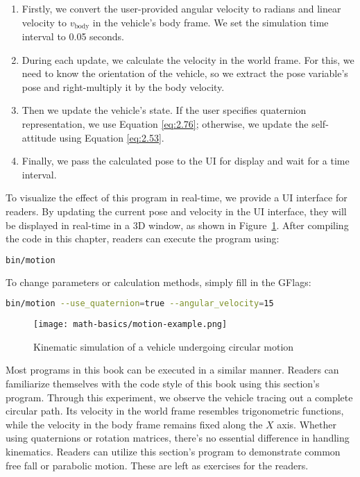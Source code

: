 \begin{enumerate}
	\item Firstly, we convert the user-provided angular velocity to radians and linear velocity to \( v_{\text{body}} \) in the vehicle's body frame. We set the simulation time interval to 0.05 seconds.
	\item During each update, we calculate the velocity in the world frame. For this, we need to know the orientation of the vehicle, so we extract the pose variable's pose and right-multiply it by the body velocity.
	\item Then we update the vehicle's state. If the user specifies quaternion representation, we use Equation \eqref{eq:2.76}; otherwise, we update the self-attitude using Equation \eqref{eq:2.53}.
	\item Finally, we pass the calculated pose to the UI for display and wait for a time interval.
\end{enumerate}

To visualize the effect of this program in real-time, we provide a UI interface for readers. By updating the current pose and velocity in the UI interface, they will be displayed in real-time in a 3D window, as shown in Figure~\ref{fig:motion-example}. After compiling the code in this chapter, readers can execute the program using:

\begin{lstlisting}[language=sh,caption=Terminal Input:]
bin/motion
\end{lstlisting}

To change parameters or calculation methods, simply fill in the GFlags:

\begin{lstlisting}[language=sh,caption=Terminal Input:]
bin/motion --use_quaternion=true --angular_velocity=15
\end{lstlisting}

\begin{figure}[!htp]
	\centering
	\texttt{[image: math-basics/motion-example.png]}
	\caption{Kinematic simulation of a vehicle undergoing circular motion}
	\label{fig:motion-example}
\end{figure}

Most programs in this book can be executed in a similar manner. Readers can familiarize themselves with the code style of this book using this section's program. Through this experiment, we observe the vehicle tracing out a complete circular path. Its velocity in the world frame resembles trigonometric functions, while the velocity in the body frame remains fixed along the $X$ axis. Whether using quaternions or rotation matrices, there's no essential difference in handling kinematics. Readers can utilize this section's program to demonstrate common free fall or parabolic motion. These are left as exercises for the readers.

